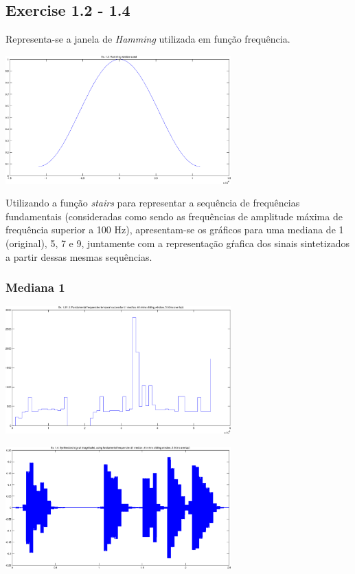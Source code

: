 \documentclass[a4paper]{article}
\begin{document}
\subsection{Exercise 1.2 - 1.4}
\indent \indent Representa-se a janela de \emph{Hamming} utilizada em função frequência.
\begin{center}
	\includegraphics[width=0.65\textwidth]{images/ex_1_2_hamming.png}
\end{center}

Utilizando a função \emph{stairs} para representar a sequência de frequências fundamentais (consideradas como sendo as frequências de amplitude máxima de frequência superior a 100 Hz), apresentam-se os gráficos para uma mediana de 1 (original), 5, 7 e 9, juntamente com a representação gŕafica dos sinais sintetizados a partir dessas mesmas sequências.

\subsubsection{Mediana 1}
\begin{center}
	\includegraphics[width=0.65\textwidth]{images/ex_1_3_succession_1.png}
\end{center}
\begin{center}
	\includegraphics[width=0.65\textwidth]{images/ex_1_4_synth_1.png}
\end{center}
\end{document}
